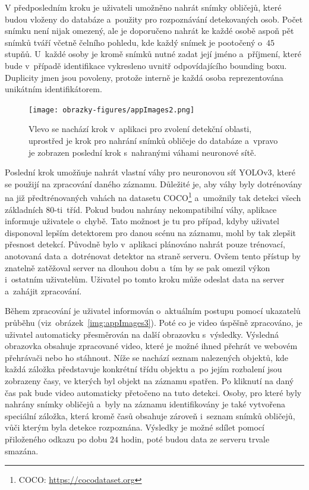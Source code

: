V předposledním kroku je uživateli umožněno nahrát snímky obličejů, které budou vloženy do databáze a~použity pro rozpoznávání detekovaných osob. Počet snímku není nijak omezený, ale je doporučeno nahrát ke každé osobě aspoň pět snímků tváří včetně čelního pohledu, kde každý snímek je pootočený o~$45$ stupňů. U~každé osoby je kromě snímků nutné zadat její jméno a~příjmení, které bude v~případě identifikace vykresleno uvnitř odpovídajícího bounding boxu. Duplicity jmen jsou povoleny, protože interně je každá osoba reprezentována unikátním identifikátorem.

\begin{figure}[hbt]
	\centering
	\setlength{\fboxsep}{0pt}
	\texttt{[image: obrazky-figures/appImages2.png]}
	\caption{Vlevo se nachází krok v~aplikaci pro zvolení detekční oblasti, uprostřed je krok pro nahrání snímků obličeje do databáze a~vpravo je zobrazen poslední krok s~nahranými váhami neuronové sítě.}
	\label{img:appImages2}
\end{figure}

Poslední krok umožňuje nahrát vlastní váhy pro neuronovou síť YOLOv3, které se použijí na zpracování daného záznamu. Důležité je, aby váhy byly dotrénovány na již předtrénovaných vahách na datasetu COCO\footnote{COCO: \url{https://cocodataset.org}} a~umožnily tak detekci všech základních $80$-ti~tříd. Pokud budou nahrány nekompatibilní váhy, aplikace informuje uživatele o~chybě. Tato možnost je tu pro případ, kdyby uživatel disponoval lepším detektorem pro danou scénu na záznamu, mohl by tak zlepšit přesnost detekcí. Původně bylo v~aplikaci plánováno nahrát pouze trénovací, anotovaná data a~dotrénovat detektor na straně serveru. Ovšem tento přístup by znatelně zatěžoval server na dlouhou dobu a~tím by se pak omezil výkon i~ostatním uživatelům. Uživatel po tomto kroku může odeslat data na server a~zahájit zpracování.

Během zpracování je uživatel informován o~aktuálním postupu pomocí ukazatelů průběhu (viz~obrázek~\ref{img:appImages3}). Poté co je video úspěšně zpracováno, je uživatel automaticky přesměrován na další obrazovku s~výsledky. Výsledná obrazovka obsahuje zpracované video, které je možné ihned přehrát ve webovém přehrávači nebo ho stáhnout. Níže se nachází seznam nalezených objektů, kde každá záložka představuje konkrétní třídu objektu a~po jejím rozbalení jsou zobrazeny časy, ve kterých byl objekt na záznamu spatřen. Po kliknutí na daný čas pak bude video automaticky přetočeno na tuto detekci. Osoby, pro které byly nahrány snímky obličejů a~byly na záznamu identifikovány je také vytvořena speciální záložka, která kromě časů obsahuje zároveň i~seznam snímků obličejů, vůči kterým byla detekce rozpoznána. Výsledky je možné sdílet pomocí přiloženého odkazu po dobu $24$ hodin, poté budou data ze serveru trvale smazána.

